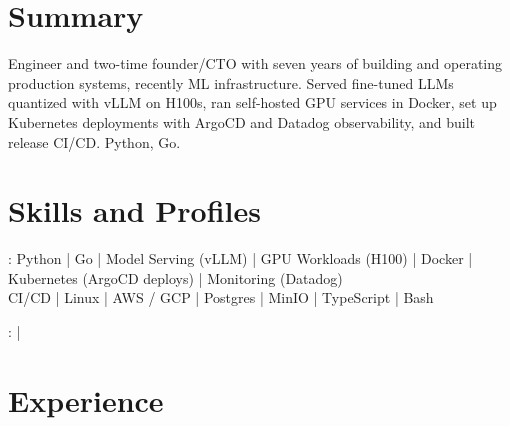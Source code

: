 \documentclass[print]{jack-resume}
\begin{document}
\pagecolor{darkmodeBackground}


\begin{minipage}[t][1cm][t]{.03\textwidth}
    \hfill
\end{minipage}

\section{Summary}
Engineer and two-time founder/CTO with seven years of building and operating production systems, recently ML infrastructure. Served fine-tuned LLMs quantized with vLLM on H100s, ran self-hosted GPU services in Docker, set up Kubernetes deployments with ArgoCD and Datadog observability, and built release CI/CD. Python, Go.
\sectionsep

\section{Skills and Profiles}
:
Python \hfill | \hfill
Go \hfill | \hfill
Model Serving (vLLM) \hfill | \hfill
GPU Workloads (H100) \hfill | \hfill
Docker \hfill | \hfill
Kubernetes (ArgoCD deploys) \hfill | \hfill
Monitoring (Datadog) \\
\hspace{1.0cm} CI/CD \hfill | \hfill
Linux \hfill | \hfill
AWS / GCP \hfill | \hfill
Postgres \hfill | \hfill
MinIO \hfill | \hfill
TypeScript \hfill | \hfill
Bash \\

\raggedright{
    :
      \href{https://www.linkedin.com/in/jack-sturtevant/}{ \ExternalLink} |
     \href{https://github.com/jacksturt}{ \ExternalLink}}

\section{Experience}
\end{document}
